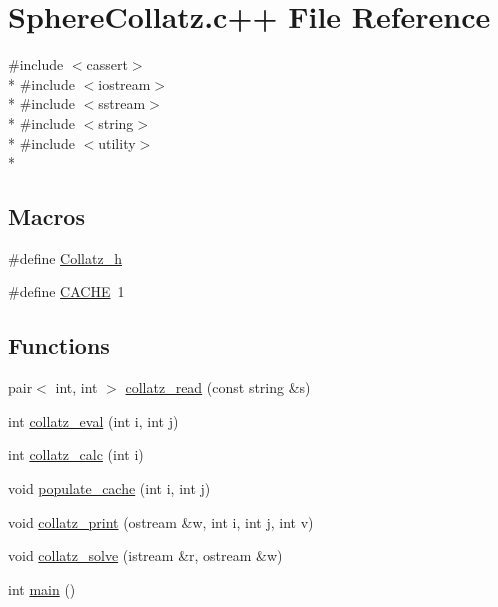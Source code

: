 \hypertarget{SphereCollatz_8c_09_09}{\section{Sphere\-Collatz.\-c++ File Reference}
\label{SphereCollatz_8c_09_09}
}
{\ttfamily \#include $<$cassert$>$}\\*
{\ttfamily \#include $<$iostream$>$}\\*
{\ttfamily \#include $<$sstream$>$}\\*
{\ttfamily \#include $<$string$>$}\\*
{\ttfamily \#include $<$utility$>$}\\*
\subsection*{Macros}
\begin{DoxyCompactItemize}
\item 
\#define \hyperlink{SphereCollatz_8c_09_09_a2fd0c8b04afe9b743ed1748a94cbaee1}{Collatz\-\_\-h}
\item 
\#define \hyperlink{SphereCollatz_8c_09_09_a43fd55aa78bd891ebbd6a450f5eecce4}{C\-A\-C\-H\-E}~1
\end{DoxyCompactItemize}
\subsection*{Functions}
\begin{DoxyCompactItemize}
\item 
pair$<$ int, int $>$ \hyperlink{SphereCollatz_8c_09_09_a2772f8a734aeab48332eb3b282f991ba}{collatz\-\_\-read} (const string \&s)
\item 
int \hyperlink{SphereCollatz_8c_09_09_a0b0d3827a619c18aa4d96b8ee8b1c47d}{collatz\-\_\-eval} (int i, int j)
\item 
int \hyperlink{SphereCollatz_8c_09_09_aacecd38aa338cae7ec4cc36760638340}{collatz\-\_\-calc} (int i)
\item 
void \hyperlink{SphereCollatz_8c_09_09_a9cd08b4656005090241088ed114e3f11}{populate\-\_\-cache} (int i, int j)
\item 
void \hyperlink{SphereCollatz_8c_09_09_aeda0b7ea3e40e1e7487ccc436f33a559}{collatz\-\_\-print} (ostream \&w, int i, int j, int v)
\item 
void \hyperlink{SphereCollatz_8c_09_09_a0ac646d2122741f9a9a52201bf9551cc}{collatz\-\_\-solve} (istream \&r, ostream \&w)
\item 
int \hyperlink{SphereCollatz_8c_09_09_ae66f6b31b5ad750f1fe042a706a4e3d4}{main} ()
\end{DoxyCompactItemize}
